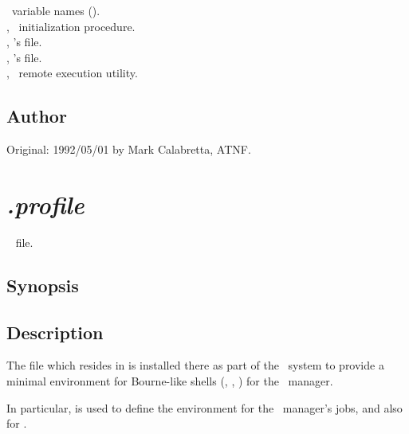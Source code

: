 \aipspp\ variable names ().\\
, \aipspp\ initialization procedure.\\
, 's  file.\\
, 's  file.\\
, \aipspp\ remote execution utility.

\subsection*{Author}

Original: 1992/05/01 by Mark Calabretta, ATNF.


\newpage
\section{\textit{.profile}}
\label{.profile}




\aipspp\  file.

\subsection*{Synopsis}

\begin{synopsis}
\end{synopsis}

\subsection*{Description}

The  file which resides in  is installed there
as part of the \aipspp\ system to provide a minimal environment for
Bourne-like shells (, , ) for the
\aipspp\ manager.

In particular,  is used to define the environment for the
\aipspp\ manager's  jobs, and also for
.

